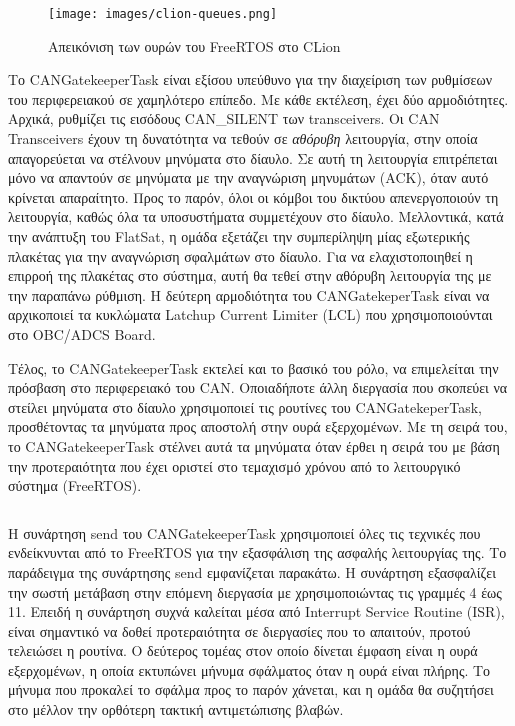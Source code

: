 \documentclass[a4paper,nobib,justified]{tufte-book}
\begin{document}
\begin{figure}[h]
	\texttt{[image: images/clion-queues.png]}
	\label{fig:clion-queues}
	\caption{Απεικόνιση των ουρών του FreeRTOS στο CLion}
\end{figure}

\par Το CANGatekeeperTask είναι εξίσου υπεύθυνο για την διαχείριση των ρυθμίσεων του περιφερειακού σε χαμηλότερο επίπεδο. Με κάθε εκτέλεση, έχει δύο αρμοδιότητες. Αρχικά, ρυθμίζει τις εισόδους CAN\_SILENT των transceivers. Οι CAN Transceivers έχουν τη δυνατότητα να τεθούν σε \textit{αθόρυβη} λειτουργία, στην οποία απαγορεύεται να στέλνουν μηνύματα στο δίαυλο. Σε αυτή τη λειτουργία επιτρέπεται μόνο να απαντούν σε μηνύματα με την αναγνώριση μηνυμάτων (ACK), όταν αυτό κρίνεται απαραίτητο. Προς το παρόν, όλοι οι κόμβοι του δικτύου απενεργοποιούν τη λειτουργία, καθώς όλα τα υποσυστήματα συμμετέχουν στο δίαυλο. Μελλοντικά, κατά την ανάπτυξη του FlatSat, η ομάδα εξετάζει την συμπερίληψη μίας εξωτερικής πλακέτας για την αναγνώριση σφαλμάτων στο δίαυλο. Για να ελαχιστοποιηθεί η επιρροή της πλακέτας στο σύστημα, αυτή θα τεθεί στην αθόρυβη λειτουργία της με την παραπάνω ρύθμιση. Η δεύτερη αρμοδιότητα του CANGatekeperTask είναι να αρχικοποιεί τα κυκλώματα Latchup Current Limiter (LCL) που χρησιμοποιούνται στο OBC/ADCS Board. 

\par Τέλος, το CANGatekeeperTask εκτελεί και το βασικό του ρόλο, να επιμελείται την πρόσβαση στο περιφερειακό του CAN. Οποιαδήποτε άλλη διεργασία που σκοπεύει να στείλει μηνύματα στο δίαυλο χρησιμοποιεί τις ρουτίνες του CANGatekeperTask, προσθέτοντας τα μηνύματα προς αποστολή στην ουρά εξερχομένων. Με τη σειρά του, το CANGatekeeperTask στέλνει αυτά τα μηνύματα όταν έρθει η σειρά του με βάση την προτεραιότητα που έχει οριστεί στο τεμαχισμό χρόνου από το λειτουργικό σύστημα (FreeRTOS).
\inputminted{c++}{code/examples/gatekeeper-execute.cpp}

Η συνάρτηση send\(\) του CANGatekeeperTask χρησιμοποιεί όλες τις τεχνικές που ενδείκνυνται από το FreeRTOS για την εξασφάλιση της ασφαλής λειτουργίας της. Το παράδειγμα της συνάρτησης send εμφανίζεται παρακάτω. Η συνάρτηση εξασφαλίζει την σωστή μετάβαση στην επόμενη διεργασία με χρησιμοποιώντας τις γραμμές 4 έως 11. Επειδή η συνάρτηση συχνά καλείται μέσα από Interrupt Service Routine (ISR), είναι σημαντικό να δοθεί προτεραιότητα σε διεργασίες που το απαιτούν, προτού τελειώσει η ρουτίνα. Ο δεύτερος τομέας στον οποίο δίνεται έμφαση είναι η ουρά εξερχομένων, η οποία εκτυπώνει μήνυμα σφάλματος όταν η ουρά είναι πλήρης. Το μήνυμα που προκαλεί το σφάλμα προς το παρόν χάνεται, και η ομάδα θα συζητήσει στο μέλλον την ορθότερη τακτική αντιμετώπισης βλαβών. 
\inputminted{c++}{code/examples/gatekeeper-send.cpp}
\end{document}
